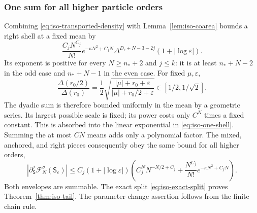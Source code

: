 \documentclass[11pt]{article}
\numberwithin{equation}{section}
\theoremstyle{definition}
\newcommand{\eps}{\varepsilon}
\begin{document}
\subsubsection{One sum for all higher particle orders}

Combining \eqref{eq:iso-transported-density} with
Lemma~\ref{lem:iso-coarea} bounds a right shell at a fixed mean by
\begin{equation}\label{eq:iso-one-shell}
 \frac{C_jN^{C_j}}{N!}e^{-\kappa N^2+C_jN}
 \Delta^{D_\ell+N-3-2j}(1+|\log\eps|).
\end{equation}
Its exponent is positive for every $N\ge n_*+2$ and $j\le k$:
it is at least $n_*+N-2$ in the odd case and $n_*+N-1$ in the
even case.  For fixed $\mu,\eps$,
\[
 \frac{\Delta(r_0/2)}{\Delta(r_0)}
 =\frac12\sqrt{\frac{|\mu|+r_0+\eps}{|\mu|+r_0/2+\eps}}
       \in[1/2,1/\sqrt2].
\]
The dyadic sum is therefore bounded uniformly in the mean by a geometric series.
Its largest possible scale is fixed; its power costs only $C^N$
times a fixed constant.  This is absorbed into the linear exponential
in \eqref{eq:iso-one-shell}.  Summing the at most $CN$ means adds
only a polynomial factor. The mixed, anchored, and right pieces
consequently obey the same bound for all higher orders,
\begin{equation}\label{eq:iso-every-order-tail}
 |\partial_{\mathsf S}^j\mathcal F_N^\sigma(\mathsf S_\eps)|
 \le C_j(1+|\log\eps|)
 \left(C_j^NN^{-N/2+C_j}
       +\frac{N^{C_j}}{N!}e^{-\kappa N^2+C_jN}\right).
\end{equation}
Both envelopes are summable.  The exact split
\eqref{eq:iso-exact-split} proves Theorem~\ref{thm:iso-tail}.
The parameter-change assertion follows from the finite chain rule.
\end{document}
